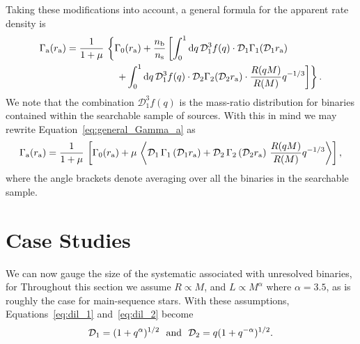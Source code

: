 \documentclass[12pt,modern,trackchanges]{aastex61}
\renewcommand{\a}{_{\rm a}}
\newcommand{\s}{_{\rm s}}
\renewcommand{\b}{_{\rm b}}
\begin{document}
Taking these modifications into account, a general formula for the
apparent rate density is
\begin{align}
    \notag
    \Gamma\a(r\a) &= \frac{1}{1+\mu} \,
    \left\{ \Gamma_0(r\a)+ 
    \frac{n\b}{n\s}
    \left[ \int_0^1 \mathrm{d}q \,
           \mathcal{D}_1^3 f(q)\cdot
           \mathcal{D}_1 \Gamma_1(\mathcal{D}_1r\a)\,
    \right.   
    \right. \\
    & \quad\quad\quad\quad\quad \left.\left.
    +\int_0^1 {\rm d}q\, 
         \mathcal{D}_1^3 f(q)\cdot \mathcal{D}_2
         \Gamma_2(\mathcal{D}_2r\a)\cdot
         \frac{R(qM)}{R(M)} q^{-1/3}
    \right] \right\}.
    \label{eq:general_Gamma_a}
\end{align}
We note that the combination $\mathcal{D}_1^3f(q)$ is the mass-ratio
distribution for binaries contained within the searchable sample of
sources.  With this in mind we may rewrite
Equation~\ref{eq:general_Gamma_a} as
\begin{align}
    \Gamma\a(r\a)
    =
    {1\over 1+\mu} \,
    \left[
       \Gamma_0(r\a)
       +\mu\,
       \left\langle
       \mathcal{D}_1 \, \Gamma_1\left(\mathcal{D}_1r\a\right)
       +
       {\mathcal{D}_2} \, \Gamma_2\left(\mathcal{D}_2r\a\right)
       \,
       {R(qM) \over R(M)}q^{-1/3}
       \right\rangle
    \right],
\end{align}
where the angle brackets denote averaging over all the binaries in the
searchable sample.



\section{Case Studies}
\label{sec:more_complicated}



We can now gauge the size of the systematic 
 associated
with unresolved binaries, for 
Throughout this
section we assume $R\propto M$, and $L \propto M^{\alpha}$ where
$\alpha = 3.5$, as is roughly the case for main-sequence stars.
With these assumptions, Equations~\ref{eq:dil_1} and~\ref{eq:dil_2}
become
\begin{equation}
  \mathcal{D}_1
  =  (1+q^\alpha)^{1/2}~~{\rm and}~~\mathcal{D}_2
  = q(1+q^{-\alpha})^{1/2}.
\end{equation}
\end{document}

